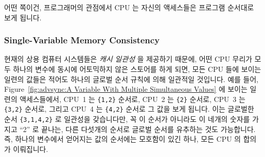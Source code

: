 어떤 쪽이건, 프로그래머의 관점에서 CPU 는 자신의 액세스들은 프로그램 순서대로
보게 됩니다.

\subsubsection{Single-Variable Memory Consistency}
\label{sec:advsync:Single-Variable Memory Consistency}

현재의 상용 컴퓨터 시스템들은 \emph{캐시 일관성} 을 제공하기 때문에, 어떤 CPU
무리가 모두 하나의 변수에 동시에 어토믹하지 않은 스토어를 하게 되면, 모든 CPU
들에 보이는 일련의 값들은 적어도 하나의 글로벌 순서 규칙에 의해 일관적일
것입니다.
예를 들어,
Figure~\ref{fig:advsync:A Variable With Multiple Simultaneous Values} 에 보이는
일련의 액세스들에서,
CPU~1 는 {\tt \{1,2\}} 순서로,
CPU~2 는 {\tt \{2\}} 순서로,
CPU~3 는 {\tt \{3,2\}} 순서로,
그리고
CPU~4 는 {\tt \{4,2\}} 순서로 그 값을 보게 됩니다.
이는 글로벌한 순서 {\tt \{3,1,4,2\}} 로 일관성을 갖습니다만, 꼭 이 순서가
아니라도 이 네개의 숫자를 가지고 ``2'' 로 끝나는, 다른 다섯개의 순서로 글로벌
순서를 유추하는 것도 가능합니다.
즉, 하나의 변수에서 얻어지는 값의 순서에는 모호함이 있긴 하나, 모든 CPU 의
합의가 이뤄집니다.

